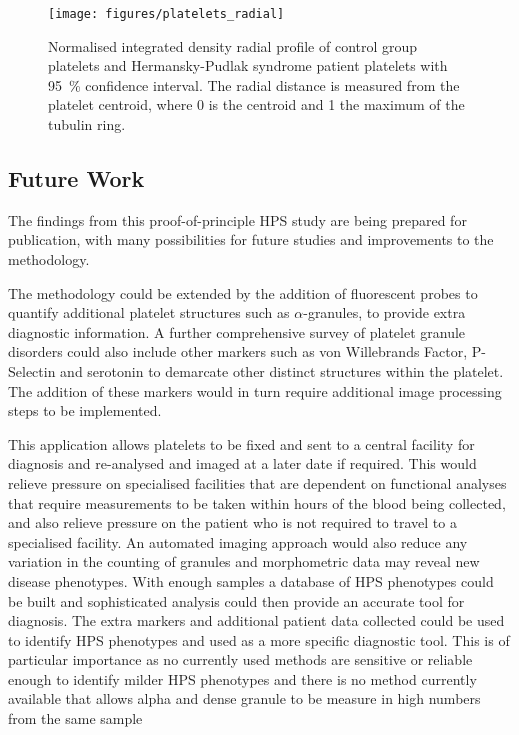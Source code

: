 \begin{figure}[htbp]
	\centering
	\texttt{[image: figures/platelets\_radial]}
	\caption{\small{Normalised integrated density radial profile of control group platelets and Hermansky-Pudlak syndrome patient platelets with \SI{95}{\percent} confidence interval. The radial distance is measured from the platelet centroid, where 0 is the centroid and 1 the maximum of the tubulin ring.}}
	\label{platelets_radial}
\end{figure}

\subsection{Future Work}
The findings from this proof-of-principle HPS study are being prepared for publication, with many possibilities for future studies and improvements to the methodology.

The methodology could be extended by the addition of fluorescent probes to quantify additional platelet structures such as $\alpha$-granules, to provide extra diagnostic information. A further comprehensive survey of platelet granule disorders could also include other markers such as von Willebrands Factor, P-Selectin and serotonin to demarcate other distinct structures within the platelet. The addition of these markers would in turn require additional image processing steps to be implemented. 

This application allows platelets to be fixed and sent to a central facility for diagnosis and re-analysed and imaged at a later date if required. This would relieve pressure on specialised facilities that are dependent on functional analyses that require measurements to be taken within hours of the blood being collected, and also relieve pressure on the patient who is not required to travel to a specialised facility. An automated imaging approach would also reduce any variation in the counting of granules and morphometric data may reveal new disease phenotypes. With enough samples a database of HPS phenotypes could be built and sophisticated analysis could then provide an accurate tool for diagnosis. The extra markers and additional patient data collected could be used to identify HPS phenotypes and used as a more specific diagnostic tool. This is of particular importance as no currently used methods are sensitive or reliable enough to identify milder HPS phenotypes and there is no method currently available that allows alpha and dense granule to be measure in high numbers from the same sample
